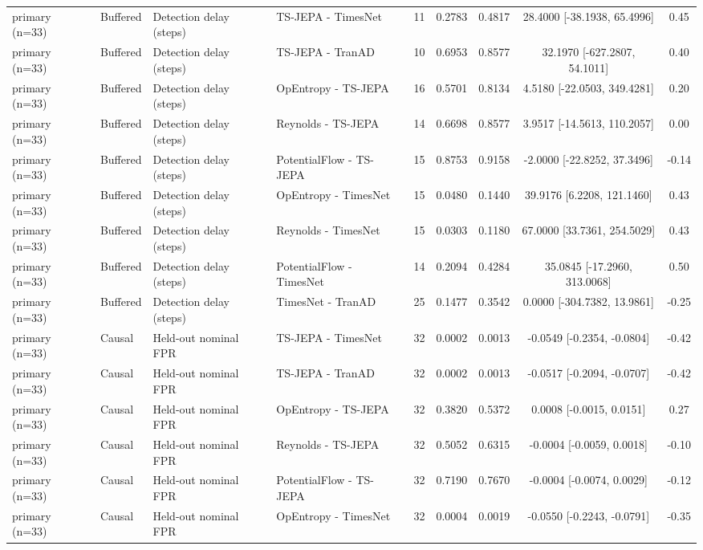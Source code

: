 \begin{table}[t]
\begin{tabular}{@{}llllccccc@{}}
primary (n=33) & Buffered & Detection delay (steps) & TS-JEPA - TimesNet & 11 & 0.2783 & 0.4817 & 28.4000 [-38.1938, 65.4996] & 0.45 \\
primary (n=33) & Buffered & Detection delay (steps) & TS-JEPA - TranAD & 10 & 0.6953 & 0.8577 & 32.1970 [-627.2807, 54.1011] & 0.40 \\
primary (n=33) & Buffered & Detection delay (steps) & OpEntropy - TS-JEPA & 16 & 0.5701 & 0.8134 & 4.5180 [-22.0503, 349.4281] & 0.20 \\
primary (n=33) & Buffered & Detection delay (steps) & Reynolds - TS-JEPA & 14 & 0.6698 & 0.8577 & 3.9517 [-14.5613, 110.2057] & 0.00 \\
primary (n=33) & Buffered & Detection delay (steps) & PotentialFlow - TS-JEPA & 15 & 0.8753 & 0.9158 & -2.0000 [-22.8252, 37.3496] & -0.14 \\
primary (n=33) & Buffered & Detection delay (steps) & OpEntropy - TimesNet & 15 & 0.0480 & 0.1440 & 39.9176 [6.2208, 121.1460] & 0.43 \\
primary (n=33) & Buffered & Detection delay (steps) & Reynolds - TimesNet & 15 & 0.0303 & 0.1180 & 67.0000 [33.7361, 254.5029] & 0.43 \\
primary (n=33) & Buffered & Detection delay (steps) & PotentialFlow - TimesNet & 14 & 0.2094 & 0.4284 & 35.0845 [-17.2960, 313.0068] & 0.50 \\
primary (n=33) & Buffered & Detection delay (steps) & TimesNet - TranAD & 25 & 0.1477 & 0.3542 & 0.0000 [-304.7382, 13.9861] & -0.25 \\
primary (n=33) & Causal & Held-out nominal FPR & TS-JEPA - TimesNet & 32 & 0.0002 & 0.0013 & -0.0549 [-0.2354, -0.0804] & -0.42 \\
primary (n=33) & Causal & Held-out nominal FPR & TS-JEPA - TranAD & 32 & 0.0002 & 0.0013 & -0.0517 [-0.2094, -0.0707] & -0.42 \\
primary (n=33) & Causal & Held-out nominal FPR & OpEntropy - TS-JEPA & 32 & 0.3820 & 0.5372 & 0.0008 [-0.0015, 0.0151] & 0.27 \\
primary (n=33) & Causal & Held-out nominal FPR & Reynolds - TS-JEPA & 32 & 0.5052 & 0.6315 & -0.0004 [-0.0059, 0.0018] & -0.10 \\
primary (n=33) & Causal & Held-out nominal FPR & PotentialFlow - TS-JEPA & 32 & 0.7190 & 0.7670 & -0.0004 [-0.0074, 0.0029] & -0.12 \\
primary (n=33) & Causal & Held-out nominal FPR & OpEntropy - TimesNet & 32 & 0.0004 & 0.0019 & -0.0550 [-0.2243, -0.0791] & -0.35 \\

\end{tabular}
\end{table}
